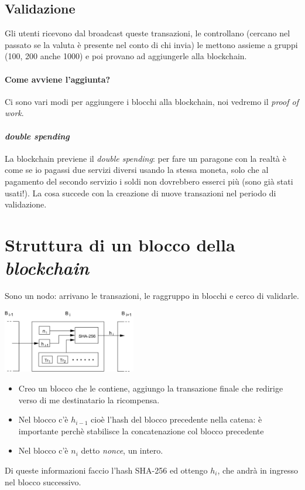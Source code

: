 \subsection{Validazione}
Gli utenti ricevono dal broadcast queste transazioni, le controllano (cercano nel passato se la valuta è presente nel conto di chi invia) le mettono assieme a gruppi (100, 200 anche 1000) e poi provano ad aggiungerle alla blockchain.

\paragraph{Come avviene l'aggiunta?} Ci sono vari modi per aggiungere i blocchi alla blockchain, noi vedremo il \emph{proof of work}.

\paragraph{\emph{double spending}} La blockchain previene il \emph{double spending}: per fare un paragone con la realtà è come se io pagassi due servizi diversi usando la stessa moneta, solo che al pagamento del secondo servizio i soldi non dovrebbero esserci più (sono già stati usati!). La cosa succede con la creazione di nuove transazioni nel periodo di validazione. 

\section{Struttura di un blocco della \emph{blockchain}}
Sono un nodo: arrivano le transazioni, le raggruppo in blocchi e cerco di validarle. 
\begin{center}
    \includegraphics[width=220px]{images/Bitcoin_1.png}
\end{center}
\begin{itemize}
	\item Creo un blocco che le contiene, aggiungo la transazione finale che redirige verso di me destinatario la ricompensa.
	\item Nel blocco c'è $h_{i-1}$ cioè l'hash del blocco precedente nella catena: è importante perchè stabilisce la concatenazione col blocco precedente 
	\item Nel blocco c'è $n_i$ detto \emph{nonce}, un intero.
\end{itemize} 
Di queste informazioni faccio l'hash SHA-256 ed ottengo $h_i$, che andrà in ingresso nel blocco successivo. 
